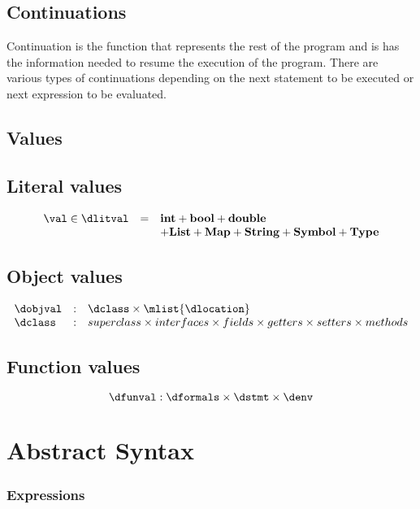 \documentclass{article}
\begin{document}
\subsection{Continuations}
\label{subsec:continuations-definition}

Continuation is the function that represents the rest of the program and is has the information needed to resume the execution of the program. 
There are various types of continuations depending on the next statement to be executed or next expression to be evaluated.

\subsection{Values}
\label{subsec:values}
\subsection{Literal values}
\label{subsubsec:literal-values}
\[
  \begin{array}{lcl}
	\val \in \dlitval &=& \mathbf{int} + \mathbf{bool} + \mathbf{double}\\
	&& + \mathbf{List} + \mathbf{Map} + \mathbf{String} + \mathbf{Symbol} + \mathbf{Type}
  \end{array}
\]
\subsection{Object values}
\label{subsec:object-values}
\[
  \begin{array}{lcl}
	\dobjval &:& \dclass \times \mlist{\dlocation}\\
	\dclass &:& superclass \times interfaces \times fields \times getters \times setters \times methods
  \end{array}
\]
\subsection{Function values}
\label{subsec:function-values}
\[
	\dfunval : \dformals \times \dstmt \times \denv
\]

\section{Abstract Syntax}
\label{sec:abstract-syntax}

\subsubsection{Expressions}
\label{sec:expr-syntax}
\end{document}
